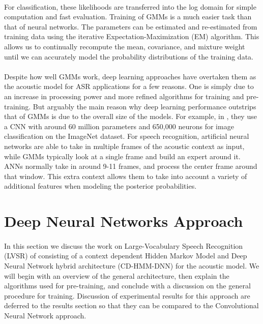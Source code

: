 \documentclass[letterpaper]{article}
\newcommand{\CNN}{Convolutional Neural Network\xspace}
\newcommand{\DNN}{Deep Neural Network\xspace}
\newcommand{\HMM}{Hidden Markov Model\xspace}
\begin{document}
\paragraph{} For classification, these likelihoods are transferred into the log domain for simple computation and fast evaluation. Training of GMMs is a much easier task than that of neural networks. The parameters can be estimated and re-estimated from training data using the iterative Expectation-Maximization (EM) algorithm. This allows us to continually recompute the mean, covariance, and mixture weight until we can accurately model the probability distributions of the training data.

\paragraph{} Despite how well GMMs work, deep learning approaches have overtaken them as the acoustic model for ASR applications for a few reasons. One is simply due to an increase in processing power and more refined algorithms for training and pre-training. But arguably the main reason why deep learning performance outstrips that of GMMs is due to the overall size of the models. For example, in \cite{DBLP:conf/nips/KrizhevskySH12}, they use a CNN with around 60 million parameters and 650,000 neurons for image classification on the ImageNet dataset. For speech recognition, artificial neural networks are able to take in multiple frames of the acoustic context as input, while GMMs typically look at a single frame and build an expert around it. ANNs normally take in around 9-11 frames, and process the center frame around that window. This extra context allows them to take into account a variety of additional features when modeling the posterior probabilities. 

\section*{Deep Neural Networks Approach} 

\paragraph{} In this section we discuss the work on Large-Vocabulary Speech Recognition (LVSR) of \cite{DBLP:journals/taslp/DahlYDA12} consisting of a context dependent \HMM and \DNN hybrid architecture (CD-HMM-DNN) for the acoustic model. We will begin with an overview of the general architecture, then explain the algorithms used for pre-training, and conclude with a discussion on the general procedure for training. Discussion of experimental results for this approach are deferred to the results section so that they can be compared to the \CNN approach.
\end{document}
